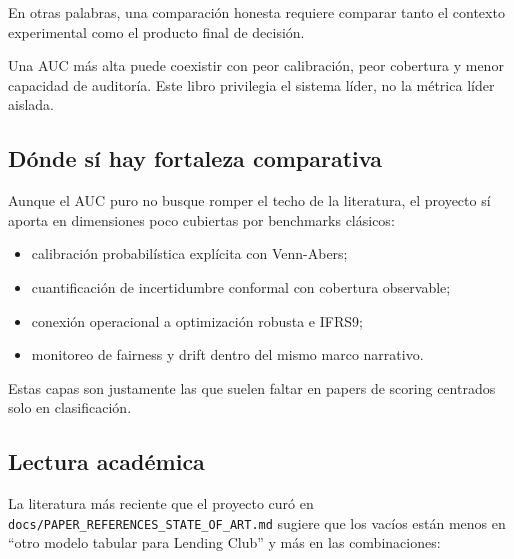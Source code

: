 \documentclass[
  spanish,
  11pt,
  letterpaper,
]{scrbook}
\providecommand{\tightlist}{%
  \setlength{\itemsep}{0pt}\setlength{\parskip}{0pt}}
\theoremstyle{plain}
\theoremstyle{remark}
\begin{document}
En otras palabras, una comparación honesta requiere comparar tanto el
contexto experimental como el producto final de decisión.

\begin{tcolorbox}[enhanced jigsaw, arc=.35mm, bottomrule=.15mm, bottomtitle=1mm, breakable, colback=white, colbacktitle=quarto-callout-note-color!10!white, colframe=quarto-callout-note-color-frame, coltitle=black, left=2mm, leftrule=.75mm, opacityback=0, opacitybacktitle=0.6, rightrule=.15mm, title=\textcolor{quarto-callout-note-color}{\faInfo}\hspace{0.5em}{Métrica líder vs sistema líder}, titlerule=0mm, toprule=.15mm, toptitle=1mm]

Una AUC más alta puede coexistir con peor calibración, peor cobertura y
menor capacidad de auditoría. Este libro privilegia el sistema líder, no
la métrica líder aislada.

\end{tcolorbox}

\subsection{Dónde sí hay fortaleza
comparativa}\label{duxf3nde-suxed-hay-fortaleza-comparativa}

Aunque el AUC puro no busque romper el techo de la literatura, el
proyecto sí aporta en dimensiones poco cubiertas por benchmarks
clásicos:

\begin{itemize}
\tightlist
\item
  calibración probabilística explícita con Venn-Abers;
\item
  cuantificación de incertidumbre conformal con cobertura observable;
\item
  conexión operacional a optimización robusta e IFRS9;
\item
  monitoreo de fairness y drift dentro del mismo marco narrativo.
\end{itemize}

Estas capas son justamente las que suelen faltar en papers de scoring
centrados solo en clasificación.

\subsection{Lectura académica}\label{lectura-acaduxe9mica}

La literatura más reciente que el proyecto curó en
\texttt{docs/PAPER\_REFERENCES\_STATE\_OF\_ART.md} sugiere que los
vacíos están menos en ``otro modelo tabular para Lending Club'' y más en
las combinaciones:
\end{document}
